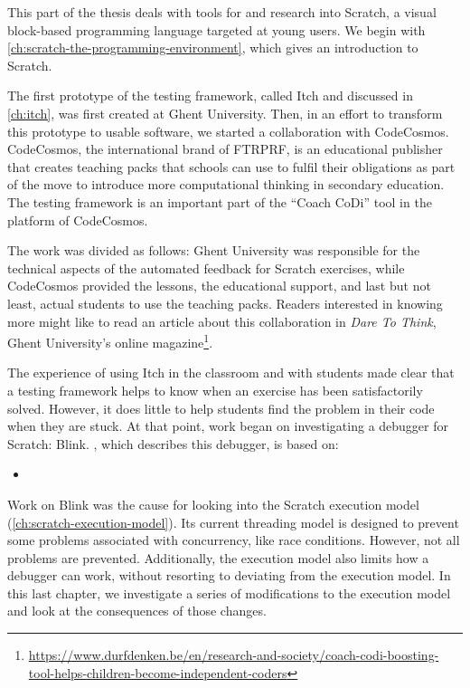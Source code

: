 \documentclass[./main]{subfiles}
\begin{document}
\label{ch:preface-2}

This part of the thesis deals with tools for and research into Scratch, a visual block-based programming language targeted at young users.
We begin with \cref{ch:scratch-the-programming-environment}, which gives an introduction to Scratch.

The first prototype of the testing framework, called Itch and discussed in \cref{ch:itch}, was first created at Ghent University.
Then, in an effort to transform this prototype to usable software, we started a collaboration with CodeCosmos.
CodeCosmos, the international brand of FTRPRF, is an educational publisher that creates teaching packs that schools can use to fulfil their obligations as part of the move to introduce more computational thinking in secondary education.
The testing framework is an important part of the ``Coach CoDi'' tool in the platform of CodeCosmos.

The work was divided as follows: Ghent University was responsible for the technical aspects of the automated feedback for Scratch exercises, while CodeCosmos provided the lessons, the educational support, and last but not least, actual students to use the teaching packs.
Readers interested in knowing more might like to read an article about this collaboration in \textit{Dare To Think}, Ghent University's online magazine\footnote{\url{https://www.durfdenken.be/en/research-and-society/coach-codi-boosting-tool-helps-children-become-independent-coders}}.

The experience of using Itch in the classroom and with students made clear that a testing framework helps to know when an exercise has been satisfactorily solved.
However, it does little to help students find the problem in their code when they are stuck.
At that point, work began on investigating a debugger for Scratch: Blink.
, which describes this debugger, is based on:

\begin{itemize}
    \item {}
\end{itemize}

Work on Blink was the cause for looking into the Scratch execution model (\cref{ch:scratch-execution-model}).
Its current threading model is designed to prevent some problems associated with concurrency, like race conditions.
However, not all problems are prevented.
Additionally, the execution model also limits how a debugger can work, without resorting to deviating from the execution model.
In this last chapter, we investigate a series of modifications to the execution model and look at the consequences of those changes.
\end{document}
